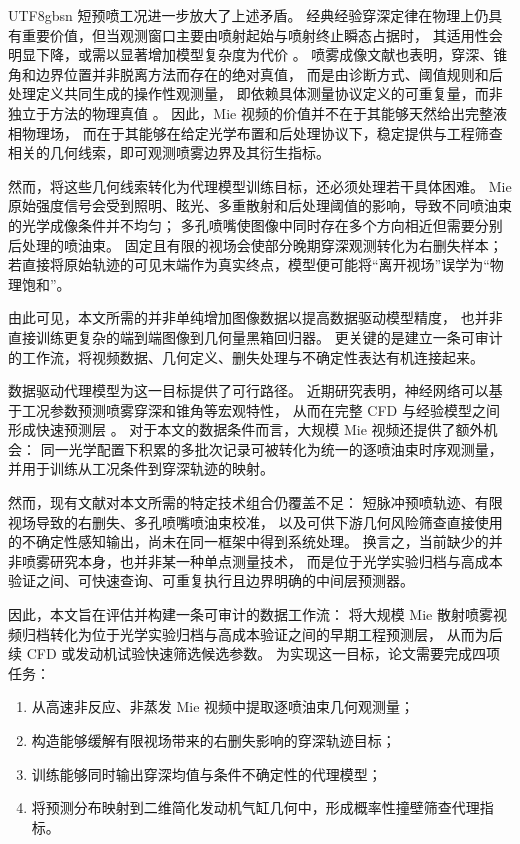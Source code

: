 \documentclass[english, 12pt, a4paper, elec, utf8, a-2b, online]{aaltothesis}
\begin{document}
\begin{CJK*}{UTF8}{gbsn}
短预喷工况进一步放大了上述矛盾。
经典经验穿深定律在物理上仍具有重要价值，但当观测窗口主要由喷射起始与喷射终止瞬态占据时，
其适用性会明显下降，或需以显著增加模型复杂度为代价 \cite{HiroyasuArai1990,ZhouLiYi2021,ZhouLiLaiWei2019}。
喷雾成像文献也表明，穿深、锥角和边界位置并非脱离方法而存在的绝对真值，
而是由诊断方式、阈值规则和后处理定义共同生成的操作性观测量，
即依赖具体测量协议定义的可重复量，而非独立于方法的物理真值
\cite{MagnottiGenzale2013,JohnsonNaberLee2012,ecn_liquid_penetration,ecn_liquid_penetration_accessory}。
因此，Mie 视频的价值并不在于其能够天然给出完整液相物理场，
而在于其能够在给定光学布置和后处理协议下，稳定提供与工程筛查相关的几何线索，即可观测喷雾边界及其衍生指标。

然而，将这些几何线索转化为代理模型训练目标，还必须处理若干具体困难。
Mie 原始强度信号会受到照明、眩光、多重散射和后处理阈值的影响，导致不同喷油束的光学成像条件并不均匀；
多孔喷嘴使图像中同时存在多个方向相近但需要分别后处理的喷油束。
固定且有限的视场会使部分晚期穿深观测转化为右删失样本；
若直接将原始轨迹的可见末端作为真实终点，模型便可能将``离开视场''误学为``物理饱和''。

由此可见，本文所需的并非单纯增加图像数据以提高数据驱动模型精度，
也并非直接训练更复杂的端到端图像到几何量黑箱回归器。
更关键的是建立一条可审计的工作流，将视频数据、几何定义、删失处理与不确定性表达有机连接起来。

数据驱动代理模型为这一目标提供了可行路径。
近期研究表明，神经网络可以基于工况参数预测喷雾穿深和锥角等宏观特性，
从而在完整 CFD 与经验模型之间形成快速预测层 \cite{VazKarathanasis2026,liu2020sprayreview}。
对于本文的数据条件而言，大规模 Mie 视频还提供了额外机会：
同一光学配置下积累的多批次记录可被转化为统一的逐喷油束时序观测量，
并用于训练从工况条件到穿深轨迹的映射。

然而，现有文献对本文所需的特定技术组合仍覆盖不足：
短脉冲预喷轨迹、有限视场导致的右删失、多孔喷嘴喷油束校准，
以及可供下游几何风险筛查直接使用的不确定性感知输出，尚未在同一框架中得到系统处理。
换言之，当前缺少的并非喷雾研究本身，也并非某一种单点测量技术，
而是位于光学实验归档与高成本验证之间、可快速查询、可重复执行且边界明确的中间层预测器。

因此，本文旨在评估并构建一条可审计的数据工作流：
将大规模 Mie 散射喷雾视频归档转化为位于光学实验归档与高成本验证之间的早期工程预测层，
从而为后续 CFD 或发动机试验快速筛选候选参数。
为实现这一目标，论文需要完成四项任务：
\begin{enumerate}
  \item 从高速非反应、非蒸发 Mie 视频中提取逐喷油束几何观测量；
  \item 构造能够缓解有限视场带来的右删失影响的穿深轨迹目标；
  \item 训练能够同时输出穿深均值与条件不确定性的代理模型；
  \item 将预测分布映射到二维简化发动机气缸几何中，形成概率性撞壁筛查代理指标。
\end{enumerate}


\end{CJK*}
\end{document}
